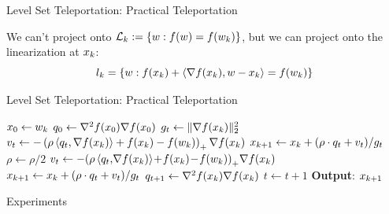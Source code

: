 \documentclass[usenames,dvipsnames,mathserif,notheorems]{beamer}
\newcommand{\good}[1]{\textcolor{good}{#1}}
\begin{document}
\begin{frame}{Level Set Teleportation: Practical Teleportation}

    We can't project onto \( \mathcal{L}_k := \left\{w : f(w) = f(w_k)\right\} \),
    but we can project onto the \good{linearization} at \( x_k \):
    \[
        l_k = \left\{ w : f(x_k) + \left\langle\nabla f(x_k), w - x_k\right\rangle = f(w_k) \right\}
    \]
    \pause
    \vspace{-4ex}

    \begin{center}
        
    \end{center}

\end{frame}

\begin{frame}{Level Set Teleportation: Practical Teleportation}

    \begin{algorithm}[H]
        \caption{Sub-level Set Teleportation}
        \label{alg:teleport}
        \begin{algorithmic}
            \STATE \( x_0 \gets w_k \)
            \STATE \( q_0 \gets \nabla^2 f(x_0) \nabla f(x_0) \)
            \STATE \( g_t \gets \|\nabla f(x_k)\|_2^2 \)
            \STATE \( v_{t} \gets - \left(\rho \left\langle q_t, \nabla f(x_k) \right\rangle + f(x_k) - f(w_k)\right)_+ \nabla f(x_k) \)
            \STATE \( x_{k+1} \gets x_k + (\rho \cdot q_t + v_t) / g_t \)
            \STATE \( \rho \gets \rho / 2 \)
            \STATE \( v_{t} \gets -\! \left(\rho \left\langle q_t, \!\nabla f(x_k) \right\rangle \!+\! f(x_k) \!-\! f(w_k)\right)_+ \!\nabla f(x_k) \)
            \STATE \( x_{k+1} \gets x_k + (\rho \cdot q_t + v_t) / g_t \)
            \ENDWHILE
            \STATE \( q_{t+1} \gets \nabla^2 f(x_k) \nabla f(x_k) \)
            \STATE \( t \gets t+1 \)
            \ENDWHILE
            \STATE \textbf{Output}: \( x_{k+1} \)
        \end{algorithmic}
    \end{algorithm}
\end{frame}

\begin{frame}{}
    \begin{center}
        \huge Experiments
    \end{center}
\end{frame}
\end{document}
